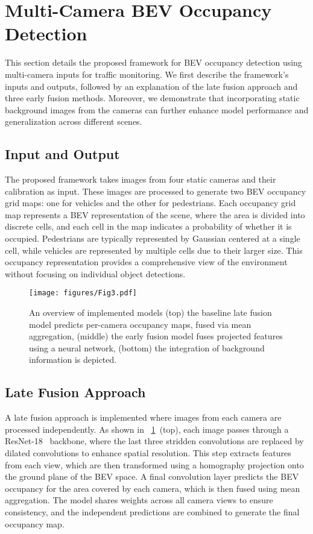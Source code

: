 \section{Multi-Camera BEV Occupancy Detection}
\label{sec:baseline_methodologies}

This section details the proposed framework for BEV occupancy detection using multi-camera inputs for traffic monitoring. We first describe the framework's inputs and outputs, followed by an explanation of the late fusion approach and three early fusion methods. Moreover, we demonstrate that incorporating static background images from the cameras can further enhance model performance and generalization across different scenes.

\subsection{Input and Output}

The proposed framework takes images from four static cameras and their calibration as input. These images are processed to generate two BEV occupancy grid maps: one for vehicles and the other for pedestrians. Each occupancy grid map represents a BEV representation of the scene, where the area is divided into discrete cells, and each cell in the map indicates a probability of whether it is occupied. Pedestrians are typically represented by Gaussian centered at a single cell, while vehicles are represented by multiple cells due to their larger size. This occupancy representation provides a comprehensive view of the environment without focusing on individual object detections.

\begin{figure}[t]
    \centering
    \texttt{[image: figures/Fig3.pdf]}
    \caption{An overview of implemented models (top) the baseline late fusion model predicts per-camera occupancy maps, fused via mean aggregation, (middle) the early fusion model fuses projected features using a neural network, (bottom) the integration of background information is depicted.}
    \label{fig:fig3}
\vspace{-0.25in}
\end{figure}
\subsection{Late Fusion Approach}

A late fusion approach is implemented where images from each camera are processed independently. As shown in \figureautorefname~\ref{fig:fig3}~(top), each image passes through a ResNet-18~\cite{resnet} backbone, where the last three stridden convolutions are replaced by dilated convolutions to enhance spatial resolution. This step extracts features from each view, which are then transformed using a homography projection onto the ground plane of the BEV space. A final convolution layer predicts the BEV occupancy for the area covered by each camera, which is then fused using mean aggregation. The model shares weights across all camera views to ensure consistency, and the independent predictions are combined to generate the final occupancy map.

